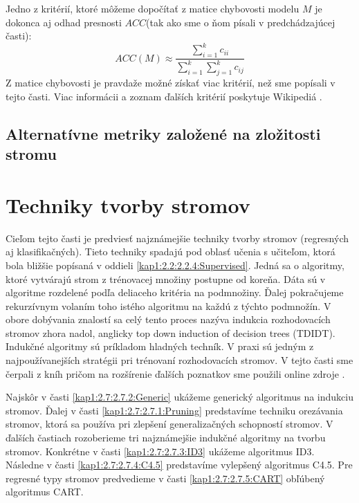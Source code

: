 Jedno z kritérií, ktoré môžeme dopočítať z matice chybovosti modelu $M$ je dokonca aj odhad presnosti $ACC$(tak ako sme o ňom písali v predchádzajúcej časti):
\begin{equation}
ACC(M) \approx \dfrac{\sum_{i=1}^{k} c_{ii}}{\sum_{i=1}^{k}\sum_{j=1}^{k} c_{ij}} \nonumber
\end{equation}
Z matice chybovosti je pravdaže možné získať viac kritérií, než sme popísali v tejto časti. Viac informácii a zoznam ďalších kritérií poskytuje Wikipediá \cite{wiki-Confusion}.

\subsection{Alternatívne metriky založené na zložitosti stromu}

\section{Techniky tvorby stromov}\label{kap1:2.7:DTTechniques}
Cieľom tejto časti je predviesť najznámejšie techniky tvorby stromov (regresných aj klasifikačných). Tieto techniky spadajú pod oblasť učenia s učiteľom, ktorá bola bližšie popísaná v oddieli \ref{kap1:2.2:2.2.4:Supervised}. Jedná sa o algoritmy, ktoré vytvárajú strom z trénovacej množiny postupne od koreňa. Dáta sú v algoritme rozdelené podľa deliaceho kritéria na podmnožiny. Ďalej pokračujeme rekurzívnym volaním toho istého algoritmu na každú z týchto podmnožín. V obore dobývania znalostí sa celý tento proces nazýva indukcia rozhodovacích stromov zhora nadol, anglicky top down induction of decision trees (TDIDT). Indukčné algoritmy sú príkladom hladných techník. V praxi sú jedným z najpoužívanejších stratégii pri trénovaní rozhodovacích stromov. V tejto časti sme čerpali z kníh \cite{kap1-DataMiningForTrees,kap1-DataMiningAndAnalysis} pričom na rozšírenie ďalších poznatkov sme použili online zdroje \cite{online-SplitCriterias,online-SplitCriteriasMatter,online-DTLectures}.

Najskôr v časti \ref{kap1:2.7:2.7.2:Generic} ukážeme generický algoritmus na indukciu stromov. Ďalej v časti \ref{kap1:2.7:2.7.1:Pruning} predstavíme techniku orezávania stromov, ktorá sa používa pri zlepšení generalizačných schopností stromov.  V ďalších častiach rozoberieme tri najznámejšie indukčné algoritmy na tvorbu stromov. Konkrétne v časti \ref{kap1:2.7:2.7.3:ID3} ukážeme algoritmus ID3. Následne v časti \ref{kap1:2.7:2.7.4:C4.5} predstavíme vylepšený algoritmus C4.5. Pre regresné typy stromov predvedieme v časti \ref{kap1:2.7:2.7.5:CART} obľúbený algoritmus CART.

